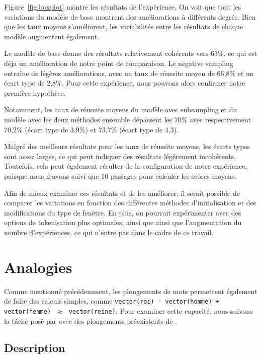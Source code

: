 \documentclass[12pt]{article}
\begin{document}
Figure~\ref{fig:boxplot} montre les résultats de l'expérience. On voit que tout les variations du modèle de base montrent des améliorations à différents degrés. Bien que les taux moyens s'améliorent, les variabilités entre les résultats de chaque modèle augmentent également. 

Le modèle de base donne des résultats relativement cohérents vers 63\%, ce qui est déja un amélioration de notre point de comparaison. Le negative sampling entraîne de légères améliorations, avec un taux de réussite moyen de 66{,}8\% et un écart type de 2{,}8\%. Pour cette expérience, nous pouvons alors confirmer notre première hypothèse. 

Notamment, les taux de réussite moyens du modèle avec subsampling et du modèle avec les deux méthodes ensemble dépassent les 70\% avec respectivement 70{,}2\% (écart type de 3{,}9\%) et 73{,}7\% (écart type de 4{,}3).

Malgré des meilleurs résultats pour les taux de réussite moyens, les écarts types sont assez larges, ce qui peut indiquer des résultats légèrement incohérents. Toutefois, cela peut également résulter de la configuration de notre expérience, puisque nous n'avons suivi que 10 passages pour calculer les scores moyens. 

Afin de mieux examiner ces résultats et de les améliorer, il serait possible de comparer les variations en fonction des différentes méthodes d'initialisation et des modifications du type de fenêtre. En plus, on pourrait expérimenter avec des options de tokenisation plus optimales, ainsi que ainsi que l'augmentation du nombre d'expériences, ce qui n’entre pas dans le cadre de ce travail.

\section{Analogies} \label{analogies}

Comme mentionné précédemment, les plongements de mots permettent également de faire des calculs simples, comme \texttt{vector(roi) - vector(homme) + vector(femme)} $\;\approx\;$ \texttt{vector(reine)}. Pour examiner cette capacité, nous suivons la tâche posé par \cite{DBLP:journals/corr/abs-1301-3781} avec des plongements préexistents de \cite{fares-etal-2017-word}.  

\subsection{Description} \label{description-2}
\end{document}
